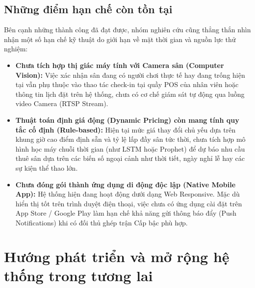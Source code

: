 \subsection{Những điểm hạn chế còn tồn tại}
Bên cạnh những thành công đã đạt được, nhóm nghiên cứu cũng thẳng thắn nhìn nhận một số hạn chế kỹ thuật do giới hạn về mặt thời gian và nguồn lực thử nghiệm:
\begin{itemize}[leftmargin=1.5cm]
    \item \textbf{Chưa tích hợp thị giác máy tính với Camera sân (Computer Vision):} Việc xác nhận sân đang có người chơi thực tế hay đang trống hiện tại vẫn phụ thuộc vào thao tác check-in tại quầy POS của nhân viên hoặc thông tin lịch đặt trên hệ thống, chưa có cơ chế giám sát tự động qua luồng video Camera (RTSP Stream).
    \item \textbf{Thuật toán định giá động (Dynamic Pricing) còn mang tính quy tắc cố định (Rule-based):} Hiện tại mức giá thay đổi chủ yếu dựa trên khung giờ cao điểm định sẵn và tỷ lệ lấp đầy sân tức thời, chưa tích hợp mô hình học máy chuỗi thời gian (như LSTM hoặc Prophet) để dự báo nhu cầu thuê sân dựa trên các biến số ngoại cảnh như thời tiết, ngày nghỉ lễ hay các sự kiện thể thao lớn.
    \item \textbf{Chưa đóng gói thành ứng dụng di động độc lập (Native Mobile App):} Hệ thống hiện đang hoạt động dưới dạng Web Responsive. Mặc dù hiển thị tốt trên trình duyệt điện thoại, việc chưa có ứng dụng cài đặt trên App Store / Google Play làm hạn chế khả năng gửi thông báo đẩy (Push Notifications) khi có đối thủ ghép trận Cấp bậc phù hợp.
\end{itemize}

\section{Hướng phát triển và mở rộng hệ thống trong tương lai}
\label{sec:huongphattrien}

